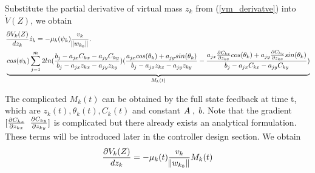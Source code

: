 \noindent Substitute the partial derivative of virtual mass ${z_k}$ from (\ref{vm_derivatve}) into ${\dot V(Z)}$, we obtain
\begin{equation} \notag
\begin{split}
&\frac{\partial V_k(Z)}{dz_k}\dot z_k = -\mu_k(\psi_{k})\frac{v_k}{\norm{w_{k_0}}}. \\
&\underbrace{cos(\psi_{k}) \displaystyle\sum_{j=1}^{m} 2ln(\frac{b_j - a_{jx}C_{kx} - a_{jy}C_{ky}}{b_j - a_{jx}z_{kx} - a_{jy}z_{ky}})(\frac{a_{jx}cos(\theta_{k}) + a_{jy}sin(\theta_{k})}{b_j - a_{jx}z_{kx} - a_{jy}z_{ky}} - \frac{a_{jx}\frac{\partial C_{kx}}{\partial z_{kx}}cos(\theta_{k}) + a_{jy}\frac{\partial C_{ky}}{\partial z_{kx}}sin(\theta_{k})}{b_j - a_{jx}C_{kx} - a_{jy}C_{ky}})}_{M_k(t)}
\end{split}
\end{equation}

\noindent The complicated $M_k(t)$ can be obtained by the full state feedback at time t, which are ${z_k(t), \theta_{k}(t), C_k(t)}$ and constant $A \txtspc{,} b$. Note that the gradient $ [\frac{\partial C_{kx}}{\partial z_{kx}} \txtspc{ } \frac{\partial C_{ky}}{\partial z_{ky}}] $ is complicated but there already exists an analytical formulation. These terms will be introduced later in the controller design section. We obtain
\begin{equation} \label{time_derivative_BLF}
\begin{split}
\frac{\partial V_k(Z)}{dz_k} &  = -\mu_k(t)\frac{v_k}{\norm{w_{k_0}}} M_k(t)\\
\end{split}
\end{equation}

